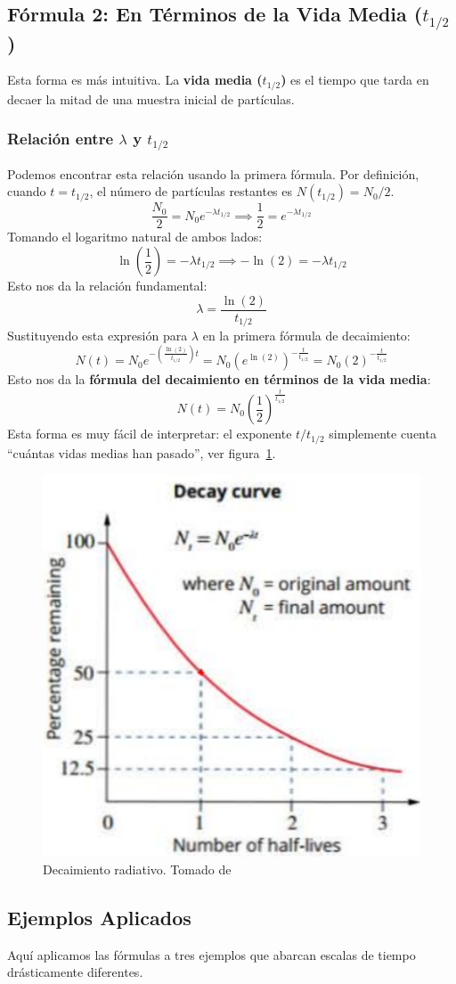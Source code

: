 \documentclass[11pt,a4paper]{article}
\begin{document}
\subsection*{Fórmula 2: En Términos de la Vida Media ($t_{1/2}$)}

Esta forma es más intuitiva. La \textbf{vida media ($t_{1/2}$)} es el tiempo que tarda en decaer la mitad de una muestra inicial de partículas.

\subsubsection*{Relación entre $\lambda$ y $t_{1/2}$}
Podemos encontrar esta relación usando la primera fórmula. Por definición, cuando $t = t_{1/2}$, el número de partículas restantes es $N(t_{1/2}) = N_0/2$.
\[ \frac{N_0}{2} = N_0 e^{-\lambda t_{1/2}} \implies \frac{1}{2} = e^{-\lambda t_{1/2}} \]
Tomando el logaritmo natural de ambos lados:
\[ \ln\left(\frac{1}{2}\right) = -\lambda t_{1/2} \implies -\ln(2) = -\lambda t_{1/2} \]
Esto nos da la relación fundamental:
\[ \boxed{\lambda = \frac{\ln(2)}{t_{1/2}}} \]
Sustituyendo esta expresión para $\lambda$ en la primera fórmula de decaimiento:
\[ N(t) = N_0 e^{-\left(\frac{\ln(2)}{t_{1/2}}\right)t} = N_0 \left(e^{\ln(2)}\right)^{-\frac{t}{t_{1/2}}} = N_0 (2)^{-\frac{t}{t_{1/2}}} \]
Esto nos da la \textbf{fórmula del decaimiento en términos de la vida media}:
\[ \boxed{N(t) = N_0 \left(\frac{1}{2}\right)^{\frac{t}{t_{1/2}}}} \]
Esta forma es muy fácil de interpretar: el exponente ${t}/{t_{1/2}}$ simplemente cuenta ``cuántas vidas medias han pasado'', ver figura~\ref{fig:decrad}.

\begin{figure}
    \centering
    \includegraphics[width=0.4\linewidth]{decaimiento}
    \caption{Decaimiento radiativo. Tomado de \cite{} }
    \label{fig:decrad}
\end{figure}

\subsection*{Ejemplos Aplicados}
Aquí aplicamos las fórmulas a tres ejemplos que abarcan escalas de tiempo drásticamente diferentes.
\end{document}
